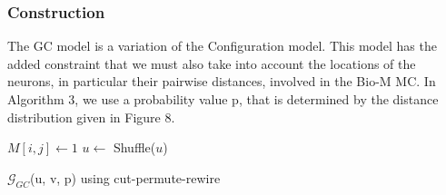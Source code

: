 \subsubsection{Construction}
The GC model is a variation of the Configuration model. This model has the added constraint that we must also take into account the locations of the neurons, in particular their pairwise distances, involved in the Bio-M MC. In Algorithm 3, we use a probability value p, that is determined by the distance distribution given in Figure 8.

\begin{algorithm}[H]
\SetAlgoLined
{}

{
{$M[i,j] \leftarrow 1$}
{$u \leftarrow$ Shuffle($u$)}}
\caption{$\mathcal{G}_{GC}$(u, v, p) using cut-permute-rewire}
\end{algorithm}

